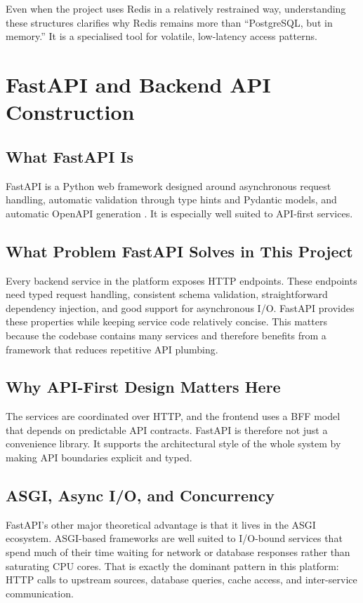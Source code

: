 Even when the project uses Redis in a relatively restrained way, understanding these structures clarifies why Redis remains more than ``PostgreSQL, but in memory.'' It is a specialised tool for volatile, low-latency access patterns.

\section{FastAPI and Backend API Construction}
\subsection{What FastAPI Is}
FastAPI is a Python web framework designed around asynchronous request handling, automatic validation through type hints and Pydantic models, and automatic OpenAPI generation \cite{fastapi_docs}. It is especially well suited to API-first services.

\subsection{What Problem FastAPI Solves in This Project}
Every backend service in the platform exposes HTTP endpoints. These endpoints need typed request handling, consistent schema validation, straightforward dependency injection, and good support for asynchronous I/O. FastAPI provides these properties while keeping service code relatively concise. This matters because the codebase contains many services and therefore benefits from a framework that reduces repetitive API plumbing.

\subsection{Why API-First Design Matters Here}
The services are coordinated over HTTP, and the frontend uses a BFF model that depends on predictable API contracts. FastAPI is therefore not just a convenience library. It supports the architectural style of the whole system by making API boundaries explicit and typed.

\subsection{ASGI, Async I/O, and Concurrency}
FastAPI's other major theoretical advantage is that it lives in the ASGI ecosystem. ASGI-based frameworks are well suited to I/O-bound services that spend much of their time waiting for network or database responses rather than saturating CPU cores. That is exactly the dominant pattern in this platform: HTTP calls to upstream sources, database queries, cache access, and inter-service communication.

